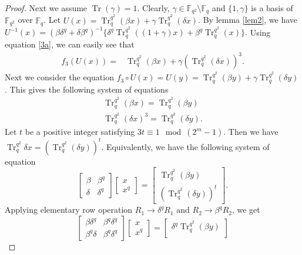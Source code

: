 \documentclass{birkjour}
\theoremstyle{definition}
\theoremstyle{remark}
\numberwithin{equation}{section}
\begin{document}
\begin{proof}
	Next we assume $\operatorname{Tr}(\gamma)=1$. Clearly, $\gamma\in \mathbb{F}_{q^2}\setminus\mathbb{F}_q$ and 
	$\{1,\gamma\}$ is a basis of $\mathbb{F}_{q^2}$ over $\mathbb{F}_{q}$.
	Let $U(x)=\operatorname{Tr}_q^{q^2}{(\beta x)}+\gamma\operatorname{Tr}_q^{q^2}(\delta x)$. By lemma \ref{lem2}, we have
	$U^{-1}(x)=(\beta\delta^{q}+\delta\beta^{q})^{-1}\{\delta^{q}\operatorname{Tr}_{q}^{q^2}((1+\gamma)x)+\beta^{q}\operatorname{Tr}_{q}^{q^2}(x)\}.$
	Using equation \ref{3a}, we can easily see that
  \begin{align}
  	f_3(U(x))
  	=&\operatorname{Tr}_q^{q^2}(\beta x)+\gamma(\operatorname{Tr}_q^{q^2}(\delta x))^3.\label{3f}
  \end{align}
	Next we consider the equation $f_3\circ U(x)=U(y)=\operatorname{Tr}_{q}^{q^2}(\beta y)+\gamma\operatorname{Tr}_{q}^{q^2}(\delta y)$. This gives the following system of equations	
	\begin{align*}
		\operatorname{Tr}_q^{q^2}(\beta x)=\operatorname{Tr}_q^{q^2}(\beta y)\\
		\operatorname{Tr}_q^{q^2}(\delta x)^3=\operatorname{Tr}_q^{q^2}(\delta y).
	\end{align*}
	Let $t$ be a positive integer satisfying $3t\equiv 1\mod{(2^m-1)}$.
	Then we have $\operatorname{Tr}_q^{q^2}{\delta x}=(\operatorname{Tr}_q^{q^2}(\delta y))^t$. Equivalently, we have the following system of equation
	$$\begin{bmatrix}
		\beta&\beta^{q}\\
		\delta&\delta^{q}
	\end{bmatrix}
	\begin{bmatrix}
		x\\x^{q}
	\end{bmatrix}=
	\begin{bmatrix}
		\operatorname{Tr}_{q}^{q^2}(\beta y)\\
		(\operatorname{Tr}_{q}^{q^2}(\delta y))^t
	\end{bmatrix}.$$
	Applying elementary row operation $R_1\rightarrow\delta^{q}R_1$ and $R_2\rightarrow\beta^{q}R_2$, we get
	$$\begin{bmatrix}
		\beta\delta^{q}&\beta^{q}\delta^{q}\\
		\beta^{q}\delta&\beta^{q}\delta^{q}
	\end{bmatrix}
	\begin{bmatrix}
		x\\x^{q}
	\end{bmatrix}=
	\begin{bmatrix}
		\delta^{q}\operatorname{Tr}_{q}^{q^2}(\beta y)\\

\end{bmatrix}$$
\end{proof}
\end{document}
